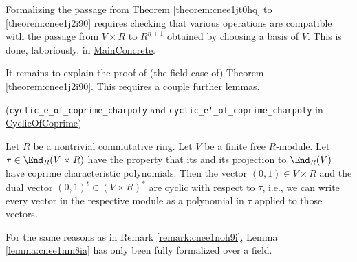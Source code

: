 \documentclass[reqno]{amsart} 
\begin{document}
Formalizing the passage from Theorem \ref{theorem:cnee1jt0hq} to \ref{theorem:cnee1j2i90} requires checking that various operations are compatible with the passage from $V \times R$ to $R^{n+1}$ obtained by choosing a basis of $V$.  This is done, laboriously, in \href{MainConcrete.lean}{MainConcrete}.

It remains to explain the proof of (the field case of) Theorem \ref{theorem:cnee1j2i90}.  This requires a couple further lemmas.

\begin{lemma}\label{lemma:cnee1nm8ia}
  (\verb|cyclic_e_of_coprime_charpoly| and \verb|cyclic_e'_of_coprime_charpoly| in \href{CyclicOfCoprime.lean}{CyclicOfCoprime})

  Let $R$ be a nontrivial commutative ring.  Let $V$ be a finite free $R$-module.  Let $\tau \in \End_R(V \times R)$ have the property that its and its projection to $\End_R(V)$ have coprime characteristic polynomials.  Then the vector $(0,1) \in V \times R$ and the dual vector $(0,1)^t \in (V \times R)^*$ are cyclic with respect to $\tau$, i.e., we can write every vector in the respective module as a polynomial in $\tau$ applied to those vectors.
\end{lemma}
\begin{remark}
  For the same reasons as in Remark \ref{remark:cnee1noh9i}, Lemma \ref{lemma:cnee1nm8ia} has only been fully formalized over a field.
\end{remark}
\end{document}
